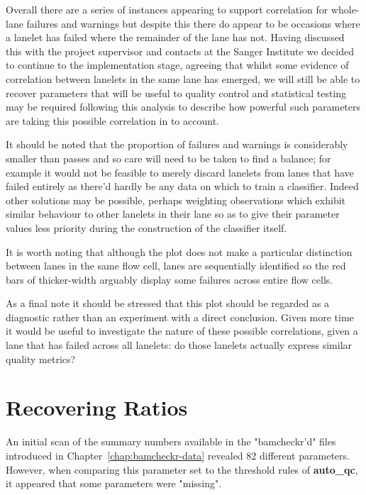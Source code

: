 Overall there are a series of instances appearing to support correlation for
whole-lane failures and warnings but despite this there do appear to be occasions
where a lanelet has failed where the remainder of the lane has not.
Having discussed this with the project supervisor and contacts at the Sanger Institute we decided to continue to
the implementation stage, agreeing that whilst some evidence of correlation
between lanelets in the same lane has emerged, we will still be able to recover
parameters that will be useful to quality control and statistical testing may be
required following this analysis to describe how powerful such parameters are
taking this possible correlation in to account.

It should be
noted that the proportion of failures and warnings is considerably smaller than
passes and so care will need to be taken to find a balance; for example it would
not be feasible to merely discard lanelets from lanes that have failed entirely
as there'd hardly be any data on which to train a classifier. Indeed other
solutions may be possible, perhaps weighting observations which exhibit similar
behaviour to other lanelets in their lane so as to give their parameter values
less priority during the construction of the classifier itself.

It is worth noting that although the plot does not make a particular
distinction between lanes in the same flow cell, lanes are sequentially
identified so the red bars of thicker-width arguably display some failures
across entire flow cells.

As a final note it should be stressed that this plot should be regarded as a
diagnostic rather than an experiment with a direct conclusion. Given more time it
would be useful to investigate the nature of these possible correlations, given
a lane that has failed across all lanelets: do those lanelets actually express
similar quality metrics?

\section{Recovering Ratios}

An initial scan of the summary numbers available in the "bamcheckr'd" files
introduced in Chapter~\ref{chap:bamcheckr-data} revealed 82 different
parameters. However, when comparing this parameter set to the threshold rules of
\textbf{auto\_qc}, it appeared that some parameters were "missing".

